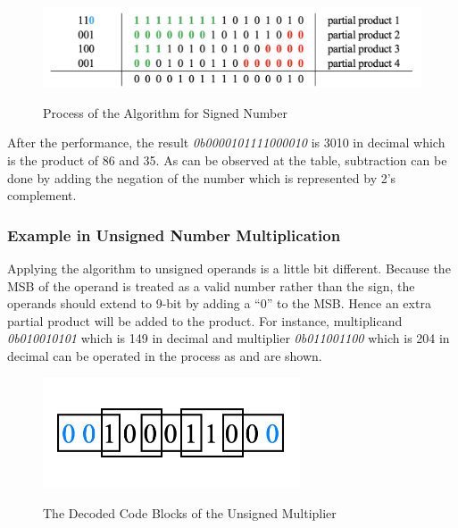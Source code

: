 \begin{figure}[!ht]
	\centering
	\caption{Process of the Algorithm for Signed Number}
	\includegraphics[width=5.7in]{../img/r4b_process_1.png}
	\label{fig:r4b_process_1}
\end{figure}

After the performance, the result \textit{0b0000101111000010} is 3010 in decimal which is the product of 86 and 35.
As can be observed at the table, subtraction can be done by adding the negation of the number which is represented
by 2’s complement.

\subsubsection{Example in Unsigned Number Multiplication}

Applying the algorithm to unsigned operands is a little bit different.
Because the MSB of the operand is treated as a valid number rather than the sign,
the operands should extend to 9-bit by adding a “0” to the MSB. Hence an extra partial product will be added to the product.
For instance, multiplicand \textit{0b010010101} which is 149 in decimal and multiplier \textit{0b011001100}
which is 204 in decimal can be operated in the process as  and  are shown.

\begin{figure}[!ht]
	\centering
	\caption{The Decoded Code Blocks of the Unsigned Multiplier}
	\includegraphics[width=3in]{../img/booth_code_2.png}
	\label{fig:booth_code_2}
\end{figure}

